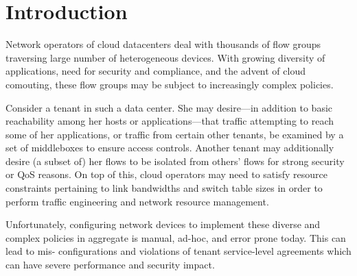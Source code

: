 \section{Introduction}

Network operators of cloud datacenters deal with thousands of flow
groups traversing large number of heterogeneous devices. With growing
diversity of applications, need for security and compliance, and the
advent of cloud comouting, these flow groups may be subject to
increasingly complex policies.

Consider a tenant in such a data center. She may desire---in addition
to basic reachability among her hosts or applications---that
traffic attempting to reach some of her applications, or traffic from
certain other tenants, be examined by a set of middleboxes to ensure
access controls. Another tenant may additionally desire (a subset of)
her flows to be isolated from others' flows for strong security or QoS
reasons. On top of this, cloud operators may need to satisfy resource
constraints pertaining to link bandwidths and switch table sizes in
order to perform traffic engineering and network resource management.

Unfortunately, configuring network devices to implement these diverse
and complex policies in aggregate is manual, ad-hoc, and error prone
today. This can lead to mis- configurations and violations of tenant
service-level agreements which can have severe performance and
security impact.



